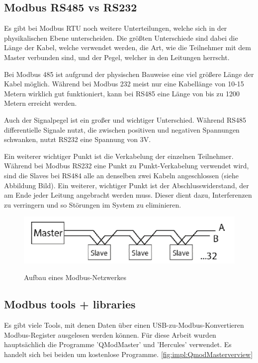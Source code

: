 \subsection{Modbus RS485 vs RS232} 
Es gibt bei Modbus RTU noch weitere Unterteilungen, welche sich in der physikalischen Ebene unterscheiden. Die größten Unterschiede sind dabei die Länge der Kabel, welche verwendet werden, die Art, wie die Teilnehmer mit dem Master verbunden sind, und der Pegel, welcher in den Leitungen herrscht.


Bei Modbus 485 ist aufgrund der physischen Bauweise eine viel größere Länge der Kabel möglich. Während bei Modbus 232 meist nur eine Kabellänge von 10-15 Metern wirklich gut funktioniert, kann bei RS485 eine Länge von bis zu 1200 Metern erreicht werden.


Auch der Signalpegel ist ein großer und wichtiger Unterschied. Während RS485 differentielle Signale nutzt, die zwischen positiven und negativen Spannungen schwanken, nutzt RS232 eine Spannung von 3V.


Ein weiterer wichtiger Punkt ist die Verkabelung der einzelnen Teilnehmer. Während bei Modbus RS232 eine Punkt zu Punkt-Verkabelung verwendet wird, sind die Slaves bei RS484 alle an denselben zwei Kabeln angeschlossen (siehe Abbildung Bild). Ein weiterer, wichtiger Punkt ist der Abschlusswiderstand, der am Ende jeder Leitung angebracht werden muss. Dieser dient dazu, Interferenzen zu verringern und so Störungen im System zu eliminieren.
\cite{UnterschiedeinModbus}




\begin{figure}[h t] \cite{modbusaufbauimg}
\centering
\includegraphics[scale=0.5]{pics/RS485-Schnittstelle-11.png}
\caption{Aufbau eines Modbus-Netzwerkes}
\label{fig:impl:WallboxModbusnetzwerk}
\end{figure}


\subsection{Modbus tools + libraries} 


Es gibt viele Tools, mit denen Daten über einen USB-zu-Modbus-Konvertieren Modbus-Register ausgelesen werden können. Für diese Arbeit wurden hauptsächlich die Programme 'QModMaster' und 'Hercules' verwendet. Es handelt sich bei beiden um kostenlose Programme. \ref{fig:impl:QmodMasterverview}


